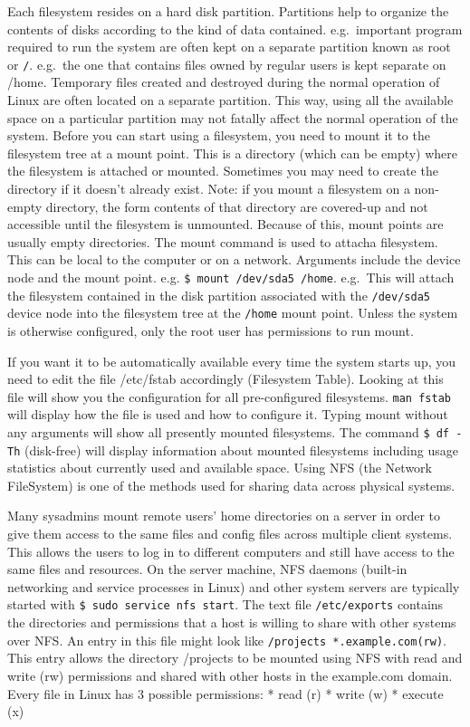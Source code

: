 Each filesystem resides on a hard disk partition. Partitions help to
organize the contents of disks according to the kind of data contained.
e.g.~important program required to run the system are often kept on a
separate partition known as root or \texttt{/}. e.g.~the one that
contains files owned by regular users is kept separate on /home.
Temporary files created and destroyed during the normal operation of
Linux are often located on a separate partition. This way, using all the
available space on a particular partition may not fatally affect the
normal operation of the system. Before you can start using a filesystem,
you need to mount it to the filesystem tree at a mount point. This is a
directory (which can be empty) where the filesystem is attached or
mounted. Sometimes you may need to create the directory if it doesn't
already exist. Note: if you mount a filesystem on a non-empty directory,
the form contents of that directory are covered-up and not accessible
until the filesystem is unmounted. Because of this, mount points are
usually empty directories. The mount command is used to attacha
filesystem. This can be local to the computer or on a network. Arguments
include the device node and the mount point. e.g.
\texttt{\$ mount /dev/sda5 /home}. e.g.~This will attach the filesystem
contained in the disk partition associated with the \texttt{/dev/sda5}
device node into the filesystem tree at the \texttt{/home} mount point.
Unless the system is otherwise configured, only the root user has
permissions to run mount.

If you want it to be automatically available every time the system
starts up, you need to edit the file /etc/fstab accordingly (Filesystem
Table). Looking at this file will show you the configuration for all
pre-configured filesystems. \texttt{man fstab} will display how the file
is used and how to configure it. Typing mount without any arguments will
show all presently mounted filesystems. The command \texttt{\$ df -Th}
(disk-free) will display information about mounted filesystems including
usage statistics about currently used and available space. Using NFS
(the Network FileSystem) is one of the methods used for sharing data
across physical systems.

Many sysadmins mount remote users' home directories on a server in order
to give them access to the same files and config files across multiple
client systems. This allows the users to log in to different computers
and still have access to the same files and resources. On the server
machine, NFS daemons (built-in networking and service processes in
Linux) and other system servers are typically started with
\texttt{\$ sudo service nfs start}. The text file \texttt{/etc/exports}
contains the directories and permissions that a host is willing to share
with other systems over NFS. An entry in this file might look like
\texttt{/projects *.example.com(rw)}. This entry allows the directory
/projects to be mounted using NFS with read and write (rw) permissions
and shared with other hosts in the example.com domain. Every file in
Linux has 3 possible permissions: * read (r) * write (w) * execute (x)

